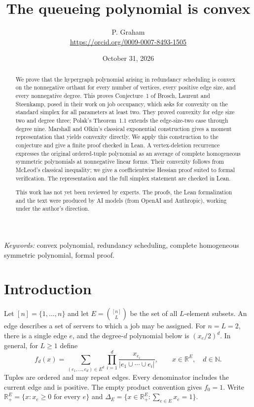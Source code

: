 \documentclass[11pt]{article}
\title{The queueing polynomial is convex}
\author{P. Graham\\ \small\url{https://orcid.org/0009-0007-8493-1505}}
\date{October 31, 2026}
\newcommand{\R}{\mathbb R}
\newcommand{\N}{\mathbb N}
\begin{document}
\maketitle
\begin{abstract}
We prove that the hypergraph polynomial arising in redundancy scheduling is
convex on the nonnegative orthant for every number of vertices, every
positive edge size, and every nonnegative degree. This proves Conjecture~1
of Brosch, Laurent and Steenkamp, posed in their work on job occupancy,
which asks for convexity on the standard simplex for all parameters at
least two. They proved convexity for edge size two and degree three;
Polak's Theorem~1.1 extends the edge-size-two case through degree nine.
Marshall and Olkin's classical exponential construction gives a moment
representation that yields convexity directly. We apply this construction
to the conjecture and give a finite proof checked in Lean. A vertex-deletion
recurrence expresses the original ordered-tuple polynomial as an average
of complete homogeneous symmetric polynomials at nonnegative linear forms.
Their convexity follows from McLeod's classical inequality; we give a
coefficientwise Hessian proof suited to formal verification. The
representation and the full simplex statement are checked in Lean.

This work has not yet been reviewed by experts.
The proofs, the Lean formalization and the text were produced by AI models
(from OpenAI and Anthropic), working under the author's direction.
\end{abstract}
\medskip
\noindent\textit{Keywords:} convex polynomial, redundancy scheduling,
complete homogeneous symmetric polynomial, formal proof.

\section{Introduction}

Let $[n]=\{1,\ldots,n\}$ and let $E=\binom{[n]}{L}$ be the set of
all $L$-element subsets. An edge describes a set of servers to which a job
may be assigned. For $n=L=2$, there is a single edge $e$, and the
degree-$d$ polynomial below is $(x_e/2)^d$. In general, for $L\geq1$ define
\begin{equation}\label{eq:f}
 f_d(x)=\sum_{(e_1,\ldots,e_d)\in E^d}
       \prod_{i=1}^d\frac{x_{e_i}}{|e_1\cup\cdots\cup e_i|},
       \qquad x\in\R^E,\quad d\in\N.
\end{equation}
Tuples are ordered and may repeat edges. Every denominator includes the
current edge and is positive. The empty product convention gives $f_0=1$.
Write $\R_+^E=\{x:x_e\geq0\text{ for every }e\}$ and
$\Delta_E=\{x\in\R_+^E:\sum_{e\in E}x_e=1\}$.
\end{document}
